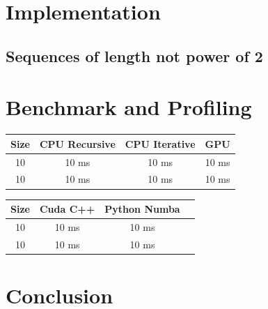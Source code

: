\documentclass[a4paper, 12pt, oneside]{article}
\begin{document}

\section{Implementation}


\subsection{Sequences of length not power of 2}

\section{Benchmark and Profiling}

\begin{center}
  \begin{tabular}{ |c|c|c|c| }
    \hline
    \textbf{Size} & \textbf{CPU Recursive} & \textbf{CPU Iterative} & \textbf{GPU} \\
    \hline
    10            & 10 ms                  & 10 ms                  & 10 ms        \\
    10            & 10 ms                  & 10 ms                  & 10 ms        \\
    \hline
  \end{tabular}
\end{center}

\begin{center}
  \begin{tabular}{ |c|c|c|c| }
    \hline
    \textbf{Size} & \textbf{Cuda C++} & \textbf{Python Numba} \\
    \hline
    10            & 10 ms             & 10 ms                 \\
    10            & 10 ms             & 10 ms                 \\
    \hline
  \end{tabular}
\end{center}

\section{Conclusion}

\printbibliography
\end{document}
